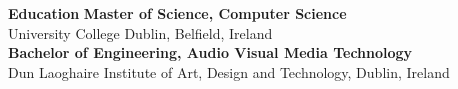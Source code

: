 \documentclass[6pt]{article}
\begin{document}
\begin{minipage}{35em}
\section*{}
{\Large \bfseries Education}
\break
\break
{\bfseries Master of Science, Computer Science} \\
University College Dublin, Belfield, Ireland \\
\break
{\bfseries Bachelor of Engineering, Audio Visual Media Technology} \\
Dun Laoghaire Institute of Art, Design and Technology, Dublin, Ireland
\end{minipage}
\end{document}
